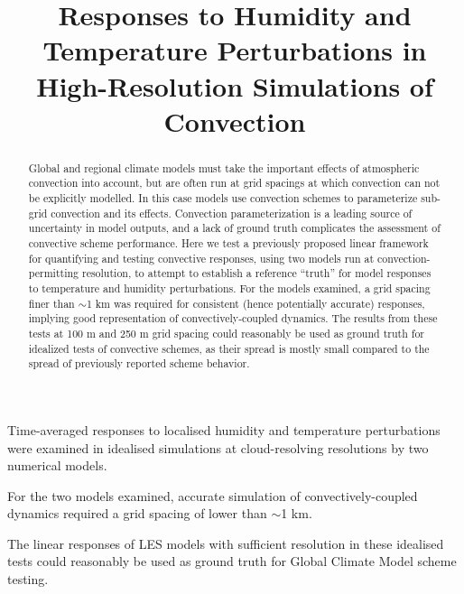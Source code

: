 \documentclass[draft]{agujournal2019}
\begin{document}
\title{Responses to Humidity and Temperature Perturbations in High-Resolution Simulations of Convection}




\begin{keypoints}
    \item Time-averaged responses to localised humidity and temperature
    perturbations were examined in idealised simulations at cloud-resolving
    resolutions by two numerical models.
    \item For the two models examined, accurate simulation of
    convectively-coupled dynamics required a grid spacing of lower than $\sim$1
    km.
    \item The linear responses of LES models with sufficient resolution in these
    idealised tests could reasonably be used as ground truth for Global Climate
    Model scheme testing.
\end{keypoints}

\justifying

\begin{abstract}
Global and regional climate models must take the important effects of
atmospheric convection into account, but are often run at grid spacings at which
convection can not be explicitly modelled. In this case models use convection
schemes to parameterize sub-grid convection and its effects. Convection
parameterization is a leading source of uncertainty in model outputs, and a lack
of ground truth complicates the assessment of convective scheme performance.
Here we test a previously proposed linear framework for quantifying and testing
convective responses, using two models run at convection-permitting resolution,
to attempt to establish a reference ``truth'' for model responses to temperature
and humidity perturbations. For the models examined, a grid spacing finer than
$\sim$1 km was required for consistent (hence potentially accurate) responses,
implying good representation of convectively-coupled dynamics. The results from
these tests at 100 m and 250 m grid spacing could reasonably be used as ground
truth for idealized tests of convective schemes, as their spread is mostly small
compared to the spread of previously reported scheme behavior.
\end{abstract}
\end{document}
